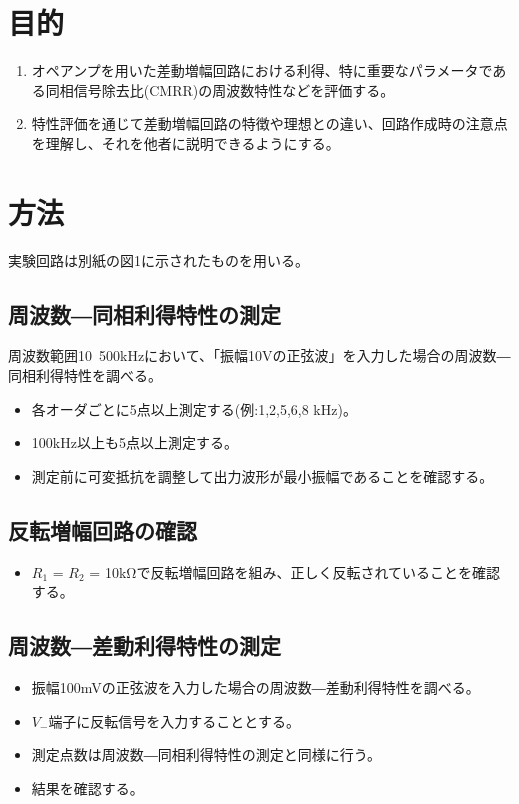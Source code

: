 \documentclass[a4paper,11pt,xelatex,ja=standard]{bxjsarticle}
\begin{document}
\section{目的}
    \begin{enumerate}
        \item オペアンプを用いた差動増幅回路における利得、特に重要なパラメータである同相信号除去比(CMRR)の周波数特性などを評価する。
        \item 特性評価を通じて差動増幅回路の特徴や理想との違い、回路作成時の注意点を理解し、それを他者に説明できるようにする。
    \end{enumerate}

\section{方法}

    実験回路は別紙の図1に示されたものを用いる。
    
    \subsection{周波数―同相利得特性の測定}  
        周波数範囲10~500kHzにおいて、「振幅10Vの正弦波」を入力した場合の周波数―同相利得特性を調べる。
        \begin{itemize}
            \item 各オーダごとに5点以上測定する(例:1,2,5,6,8 kHz)。
            \item 100kHz以上も5点以上測定する。
            \item 測定前に可変抵抗を調整して出力波形が最小振幅であることを確認する。
        \end{itemize}
    
    \subsection{反転増幅回路の確認}
        \begin{itemize}
            \item $R_1$ = $R_2$ = 10kΩで反転増幅回路を組み、正しく反転されていることを確認する。
        \end{itemize}
        
    \subsection{周波数―差動利得特性の測定}
        \begin{itemize}
            \item 振幅100mVの正弦波を入力した場合の周波数―差動利得特性を調べる。
            \item $V_-$端子に反転信号を入力することとする。
            \item 測定点数は周波数―同相利得特性の測定と同様に行う。
            \item 結果を確認する。
        \end{itemize}
    
\end{document}
